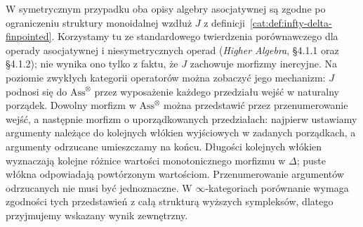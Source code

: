 W symetrycznym przypadku oba opisy algebry asocjatywnej są zgodne po ograniczeniu struktury monoidalnej wzdłuż $J$ z definicji~\ref{cat:def:infty-delta-finpointed}. Korzystamy tu ze standardowego twierdzenia porównawczego dla operady asocjatywnej i niesymetrycznych operad (\emph{Higher Algebra}, \S4.1.1 oraz \S4.1.2); nie wynika ono tylko z faktu, że $J$ zachowuje morfizmy inercyjne. Na poziomie zwykłych kategorii operatorów można zobaczyć jego mechanizm: $J$ podnosi się do $\mathrm{Ass}^\otimes$ przez wyposażenie każdego przedziału wejść w naturalny porządek. Dowolny morfizm w $\mathrm{Ass}^\otimes$ można przedstawić przez przenumerowanie wejść, a następnie morfizm o uporządkowanych przedziałach: najpierw ustawiamy argumenty należące do kolejnych włókien wyjściowych w zadanych porządkach, a argumenty odrzucane umieszczamy na końcu. Długości kolejnych włókien wyznaczają kolejne różnice wartości monotonicznego morfizmu w $\Delta$; puste włókna odpowiadają powtórzonym wartościom. Przenumerowanie argumentów odrzucanych nie musi być jednoznaczne. W $\infty$-kategoriach porównanie wymaga zgodności tych przedstawień z całą strukturą wyższych sympleksów, dlatego przyjmujemy wskazany wynik zewnętrzny.

